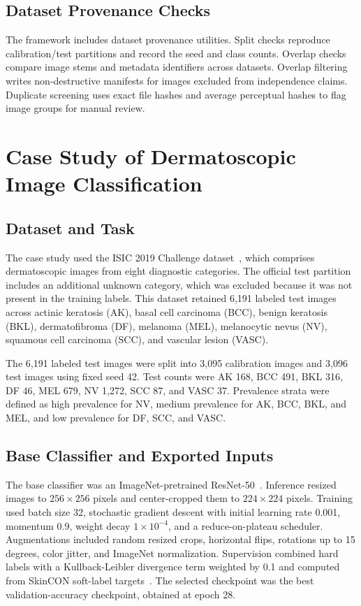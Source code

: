 ﻿\documentclass[preprint,12pt]{elsarticle}
\begin{document}
\subsection{Dataset Provenance Checks}

The framework includes dataset provenance utilities. Split checks reproduce calibration/test partitions and record the seed and class counts. Overlap checks compare image stems and metadata identifiers across datasets. Overlap filtering writes non-destructive manifests for images excluded from independence claims. Duplicate screening uses exact file hashes and average perceptual hashes to flag image groups for manual review.

\section{Case Study of Dermatoscopic Image Classification}
\label{sec-case-study}

\subsection{Dataset and Task}

The case study used the ISIC 2019 Challenge dataset~\cite{combalia2019bcn20000,tschandl2018ham10000}, which comprises dermatoscopic images from eight diagnostic categories. The official test partition includes an additional unknown category, which was excluded because it was not present in the training labels. This dataset retained 6,191 labeled test images across actinic keratosis (AK), basal cell carcinoma (BCC), benign keratosis (BKL), dermatofibroma (DF), melanoma (MEL), melanocytic nevus (NV), squamous cell carcinoma (SCC), and vascular lesion (VASC).

The 6,191 labeled test images were split into 3,095 calibration images and 3,096 test images using fixed seed 42. Test counts were AK 168, BCC 491, BKL 316, DF 46, MEL 679, NV 1,272, SCC 87, and VASC 37. Prevalence strata were defined as high prevalence for NV, medium prevalence for AK, BCC, BKL, and MEL, and low prevalence for DF, SCC, and VASC.

\subsection{Base Classifier and Exported Inputs}

The base classifier was an ImageNet-pretrained ResNet-50~\cite{he2016deep}. Inference resized images to $256 \times 256$ pixels and center-cropped them to $224 \times 224$ pixels. Training used batch size 32, stochastic gradient descent with initial learning rate 0.001, momentum 0.9, weight decay $1 \times 10^{-4}$, and a reduce-on-plateau scheduler. Augmentations included random resized crops, horizontal flips, rotations up to 15 degrees, color jitter, and ImageNet normalization. Supervision combined hard labels with a Kullback-Leibler divergence term weighted by 0.1 and computed from SkinCON soft-label targets~\cite{ren2024skincon}. The selected checkpoint was the best validation-accuracy checkpoint, obtained at epoch 28.
\end{document}
